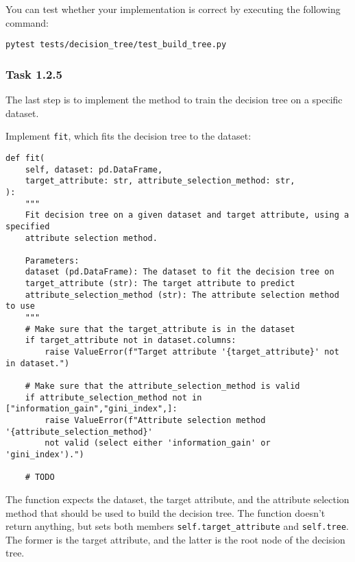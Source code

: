 \documentclass[
english,
smallborders
]{i6prcsht}
\begin{document}
You can test whether your implementation is correct by executing the following command:

\vspace*{0.3cm}

\begin{lstlisting}
pytest tests/decision_tree/test_build_tree.py
\end{lstlisting}

\vspace*{0.1cm}

\subsubsection*{Task 1.2.5}

The last step is to implement the method to train the decision tree on a specific dataset.

Implement \texttt{fit}, which fits the decision tree to the dataset:

\vspace*{0.3cm}

\begin{lstlisting}
def fit(
	self, dataset: pd.DataFrame,
	target_attribute: str, attribute_selection_method: str,
):
	"""
	Fit decision tree on a given dataset and target attribute, using a specified
	attribute selection method.

	Parameters:
	dataset (pd.DataFrame): The dataset to fit the decision tree on
	target_attribute (str): The target attribute to predict
	attribute_selection_method (str): The attribute selection method to use
	"""
	# Make sure that the target_attribute is in the dataset
	if target_attribute not in dataset.columns:
		raise ValueError(f"Target attribute '{target_attribute}' not in dataset.")

	# Make sure that the attribute_selection_method is valid
	if attribute_selection_method not in ["information_gain","gini_index",]:
		raise ValueError(f"Attribute selection method '{attribute_selection_method}'
		not valid (select either 'information_gain' or 'gini_index').")

	# TODO
\end{lstlisting}

\vspace*{0.1cm}

The function expects the dataset, the target attribute, and the attribute selection method that should be used to build the decision tree. The function doesn't return anything, but sets both members \texttt{self.target\_attribute} and \texttt{self.tree}. The former is the target attribute, and the latter is the root node of the decision tree.
\end{document}
